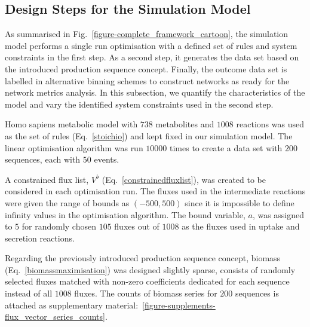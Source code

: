 \subsection{Design Steps for the Simulation Model}

As summarised in Fig.~\ref{figure-complete_framework_cartoon}, the simulation model performs a single run optimisation with a defined set of rules and system constraints in the first step. As a second step, it generates the data set based on the introduced production sequence concept. Finally, the outcome data set is labelled in alternative binning schemes to construct networks as ready for the network metrics analysis. In this subsection, we quantify the characteristics of the model and vary the identified system constraints used in the second step.

Homo sapiens metabolic model with $738$ metabolites and $1008$ reactions was used as the set of rules (Eq.~\ref{stoichio}) and kept fixed in our simulation model. The linear optimisation algorithm was run $10000$ times to create a data set with $200$ sequences, each with $50$ events.

A constrained flux list, $V^{b}$ (Eq.~\ref{constrainedfluxlist}), was created to be considered in each optimisation run. The fluxes used in the intermediate reactions were given the range of bounds as $(-500, 500)$ since it is impossible to define infinity values in the optimisation algorithm. The bound variable, $a$, was assigned to $5$ for randomly chosen $105$ fluxes out of $1008$ as the fluxes used in uptake and secretion reactions.

Regarding the previously introduced production sequence concept, biomass (Eq.~\ref{biomassmaximisation}) was designed slightly sparse, consists of randomly selected fluxes matched with non-zero coefficients dedicated for each sequence instead of all $1008$ fluxes. The counts of biomass series for $200$ sequences is attached as supplementary material:~\ref{figure-supplements-flux_vector_series_counts}.

